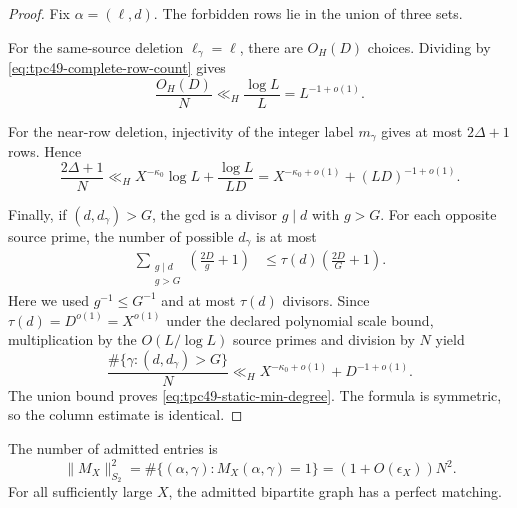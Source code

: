 \begin{proof}
Fix \(\alpha=(\ell,d)\).  The forbidden rows lie in the union of three
sets.

For the same-source deletion \(\ell_\gamma=\ell\), there are \(O_H(D)\)
choices.  Dividing by \eqref{eq:tpc49-complete-row-count} gives
\begin{equation}
 \frac{O_H(D)}N\ll_H\frac{\log L}{L}=L^{-1+o(1)}.
 \label{eq:tpc49-same-source-degree}
\end{equation}

For the near-row deletion, injectivity of the integer label \(m_\gamma\)
gives at most \(2\Delta+1\) rows.  Hence
\begin{equation}
 \frac{2\Delta+1}{N}
 \ll_H X^{-\kappa_0}\log L+\frac{\log L}{LD}
 =X^{-\kappa_0+o(1)}+(LD)^{-1+o(1)}.
 \label{eq:tpc49-near-row-degree}
\end{equation}

Finally, if \((d,d_\gamma)>G\), the gcd is a divisor
\(g\mid d\) with \(g>G\).  For each opposite source prime, the number
of possible \(d_\gamma\) is at most
\begin{align}
 \sum_{\substack{g\mid d\\g>G}}
 \left(\frac{2D}{g}+1\right)
 &\le \tau(d)\left(\frac{2D}{G}+1\right).
 \label{eq:tpc49-gcd-bad-divisor-count}
\end{align}
Here we used \(g^{-1}\le G^{-1}\) and at most \(\tau(d)\) divisors.
Since \(\tau(d)=D^{o(1)}=X^{o(1)}\) under the declared polynomial
scale bound, multiplication by the
\(O(L/\log L)\) source primes and division by \(N\) yield
\begin{equation}
 \frac{\#\{\gamma:(d,d_\gamma)>G\}}N
 \ll_H X^{-\kappa_0+o(1)}+D^{-1+o(1)}.
 \label{eq:tpc49-gcd-bad-degree}
\end{equation}
The union bound proves \eqref{eq:tpc49-static-min-degree}.  The formula
is symmetric, so the column estimate is identical.
\end{proof}

\begin{corollary}
\label{cor:tpc49-static-density-matching}
The number of admitted entries is
\begin{equation}
 \|M_X\|_{S_2}^2
 =\#\{(\alpha,\gamma):M_X(\alpha,\gamma)=1\}
 =(1+O(\epsilon_X))N^2.
 \label{eq:tpc49-static-Frobenius}
\end{equation}
For all sufficiently large \(X\), the admitted bipartite graph has a
perfect matching.
\end{corollary}

